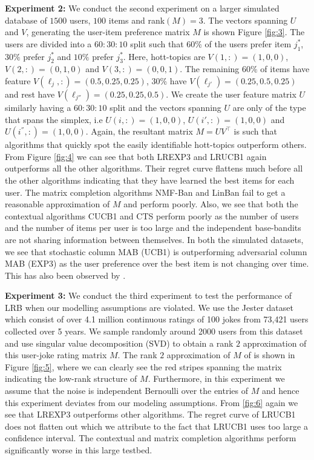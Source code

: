 \textbf{Experiment 2:} We conduct the second experiment on a larger simulated database of $1500$ users, $100$ items and rank$(M)=3$. The vectors spanning $U$ and $V$, generating the user-item preference matrix $M$ is shown Figure \ref{fig:3}. The users are divided into a $60:30:10$ split such that $60\%$ of the users prefer item $j^*_1$, $30\%$ prefer $j^*_2$ and $10\%$ prefer $j_3^*$.  Here, hott-topics are $V(1,:) = (1,0,0)$, $V(2,:) = (0,1, 0)$ and $V(3,:) = (0,0,1)$. The remaining $60\%$ of items have feature  $V(\ell_{j},:) = (0.5, 0.25,0.25)$, $30\%$ have $V(\ell_{j'}) = (0.25, 0.5, 0.25)$ and rest have $V(\ell_{j''}) = (0.25, 0.25, 0.5)$. We create the user feature matrix $U$ similarly having a $60:30:10$ split and the vectors spanning $U$ are only of the type that spans the simplex, i.e $U(i,:)=(1,0,0)$, $U(i',:)=(1,0,0)$ and $U(i^{''},:)=(1,0,0)$. Again, the resultant matrix $M =UV^{\intercal}$ is such that algorithms that quickly spot the easily identifiable hott-topics outperform others. From Figure \ref{fig:4} we can see that both LREXP3 and LRUCB1 again outperforms all the other algorithms. Their regret curve flattens much before all the other algorithms indicating that they have learned the best items for each user. The matrix completion algorithms NMF-Ban and LinBan fail to get a reasonable approximation of $M$ and perform poorly. Also, we see that both the contextual algorithms CUCB1 and CTS perform poorly as the number of users and the number of items per user is too large and the independent base-bandits are not sharing information between themselves. In both the simulated datasets, we see that stochastic column MAB (UCB1) is outperforming adversarial column MAB (EXP3) as the user preference over the best item is not changing over time. This has also been observed by \citet{radlinski2008learning}.


\textbf{Experiment 3:} We conduct the third experiment to test the performance of LRB when our modelling assumptions are violated. We use the Jester dataset \citep{goldberg2001eigentaste} which consist of over 4.1 million continuous ratings of 100 jokes from 73,421 users collected over 5 years. We sample randomly around 2000 users from this dataset and use singular value decomposition (SVD) to obtain a rank $2$ approximation of this user-joke rating matrix $M$. The rank $2$ approximation of $M$ of  is shown in Figure \ref{fig:5}, where we can clearly see the red stripes spanning the matrix indicating the low-rank structure of $M$. Furthermore, in this experiment we assume that the noise is independent Bernoulli over the entries of $M$ and hence this experiment deviates from our modeling assumptions. From \ref{fig:6} again we see that LREXP3 outperforms other algorithms. The regret curve of LRUCB1 does not flatten out which we attribute to the fact that LRUCB1 uses too large a confidence interval. The contextual and matrix completion algorithms perform significantly worse in this large testbed.




